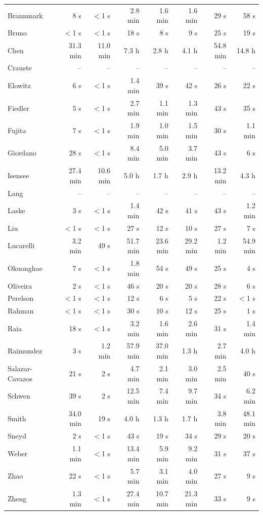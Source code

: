 \begin{longtable}{@{}lrrrrrrr@{}}
Brannmark & 8 s & $<$1 s & 2.8 min & 1.6 min & 1.6 min & 29 s & 58 s \\
Bruno & $<$1 s & $<$1 s & 18 s & 8 s & 9 s & 25 s & 19 s \\
Chen & 31.3 min & 11.0 min & 7.3 h & 2.8 h & 4.1 h & 54.8 min & 14.8 h \\
Crauste & -- & -- & -- & -- & -- & -- & -- \\
Elowitz & 6 s & $<$1 s & 1.4 min & 39 s & 42 s & 26 s & 22 s \\
Fiedler & 5 s & $<$1 s & 2.7 min & 1.1 min & 1.3 min & 43 s & 35 s \\
Fujita & 7 s & $<$1 s & 1.9 min & 1.0 min & 1.5 min & 30 s & 1.1 min \\
Giordano & 28 s & $<$1 s & 8.4 min & 5.0 min & 3.7 min & 43 s & 6 s \\
Isensee & 27.4 min & 10.6 min & 5.0 h & 1.7 h & 2.9 h & 13.2 min & 4.3 h \\
Lang & -- & -- & -- & -- & -- & -- & -- \\
Laske & 3 s & $<$1 s & 1.4 min & 42 s & 41 s & 43 s & 1.2 min \\
Liu & $<$1 s & $<$1 s & 27 s & 12 s & 10 s & 27 s & 7 s \\
Lucarelli & 3.2 min & 49 s & 51.7 min & 23.6 min & 29.2 min & 1.2 min & 54.9 min \\
Okuonghae & 7 s & $<$1 s & 1.8 min & 54 s & 49 s & 25 s & 4 s \\
Oliveira & 2 s & $<$1 s & 46 s & 20 s & 20 s & 28 s & 6 s \\
Perelson & $<$1 s & $<$1 s & 12 s & 6 s & 5 s & 22 s & $<$1 s \\
Rahman & $<$1 s & $<$1 s & 30 s & 10 s & 12 s & 25 s & 1 s \\
Raia & 18 s & $<$1 s & 3.2 min & 1.6 min & 2.6 min & 31 s & 1.4 min \\
Raimundez & 3 s & 1.2 min & 57.9 min & 37.0 min & 1.3 h & 2.7 min & 4.0 h \\
Salazar-Cavazos & 21 s & 2 s & 4.7 min & 2.1 min & 3.0 min & 2.5 min & 40 s \\
Schwen & 39 s & 2 s & 12.5 min & 7.4 min & 9.7 min & 34 s & 6.2 min \\
Smith & 34.0 min & 19 s & 4.0 h & 1.3 h & 1.7 h & 3.8 min & 48.1 min \\
Sneyd & 2 s & $<$1 s & 43 s & 19 s & 34 s & 29 s & 20 s \\
Weber & 1.1 min & $<$1 s & 13.4 min & 5.9 min & 9.2 min & 31 s & 37 s \\
Zhao & 22 s & $<$1 s & 5.7 min & 3.1 min & 4.0 min & 27 s & 9 s \\
Zheng & 1.3 min & $<$1 s & 27.4 min & 10.7 min & 21.3 min & 33 s & 9 s \\
\bottomrule
\end{longtable}
